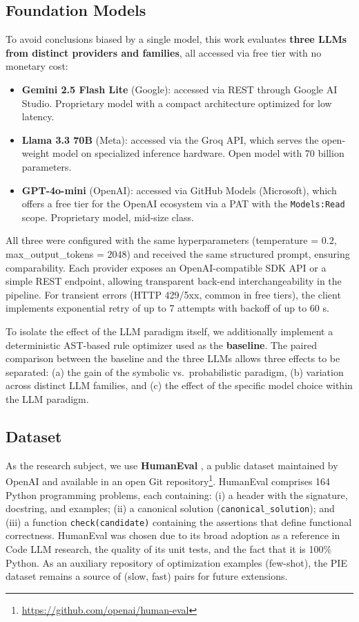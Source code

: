 \documentclass[conference]{IEEEtran}
\begin{document}
\subsection{Foundation Models}
To avoid conclusions biased by a single model, this work evaluates \textbf{three LLMs from distinct providers and families}, all accessed via free tier with no monetary cost:

\begin{itemize}
  \item \textbf{Gemini 2.5 Flash Lite} (Google): accessed via REST through Google AI Studio. Proprietary model with a compact architecture optimized for low latency.
  \item \textbf{Llama 3.3 70B} (Meta): accessed via the Groq API, which serves the open-weight model on specialized inference hardware. Open model with 70 billion parameters.
  \item \textbf{GPT-4o-mini} (OpenAI): accessed via GitHub Models (Microsoft), which offers a free tier for the OpenAI ecosystem via a PAT with the \texttt{Models:Read} scope. Proprietary model, mid-size class.
\end{itemize}

All three were configured with the same hyperparameters (temperature = $0.2$, max\_output\_tokens = $2048$) and received the same structured prompt, ensuring comparability. Each provider exposes an OpenAI-compatible SDK API or a simple REST endpoint, allowing transparent back-end interchangeability in the pipeline. For transient errors (HTTP 429/5xx, common in free tiers), the client implements exponential retry of up to 7 attempts with backoff of up to 60 s.

To isolate the effect of the LLM paradigm itself, we additionally implement a deterministic AST-based rule optimizer used as the \textbf{baseline}. The paired comparison between the baseline and the three LLMs allows three effects to be separated: (a) the gain of the symbolic vs.\ probabilistic paradigm, (b) variation across distinct LLM families, and (c) the effect of the specific model choice within the LLM paradigm.

\subsection{Dataset}
As the research subject, we use \textbf{HumanEval} \cite{DBLP:journals/corr/abs-2107-03374}, a public dataset maintained by OpenAI and available in an open Git repository\footnote{\url{https://github.com/openai/human-eval}}. HumanEval comprises 164 Python programming problems, each containing: (i) a header with the signature, docstring, and examples; (ii) a canonical solution (\texttt{canonical\_solution}); and (iii) a function \texttt{check(candidate)} containing the assertions that define functional correctness. HumanEval was chosen due to its broad adoption as a reference in Code LLM research, the quality of its unit tests, and the fact that it is 100\% Python. As an auxiliary repository of optimization examples (few-shot), the PIE dataset \cite{DBLP:journals/corr/abs-2302-07867} remains a source of (slow, fast) pairs for future extensions.
\end{document}
